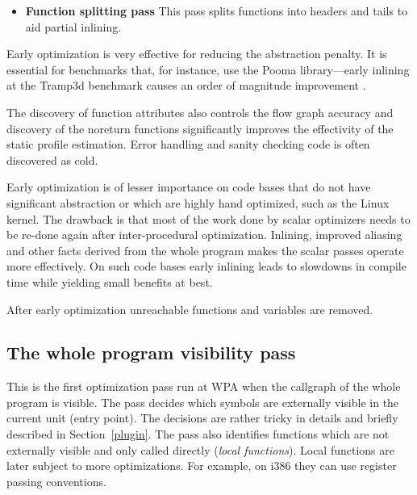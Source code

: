 \documentclass[final]{ols}
\begin{document}
\begin{itemize}
GCC has C and C++ language
extensions that allow the programmer to specify several function attributes as
optimization hints.  In this pass some of those attributes can be auto-detected.
In particular we detect functions that cannot throw
(), functions that never returns (), and
 and  functions.  Const functions in GCC terminology
are functions that only return their value and their return value
depends only on the function arguments. For many optimization passes const functions behave like a
simple expression (allowing dead code removal, common subexpression
elimination etc.).  Pure functions are like const functions but are allowed to read global
memory. See \cite{GCCmanual} for details.
\item {\bf Function splitting pass}  This pass splits functions into headers
and tails to aid partial inlining.
\end{itemize}
Early optimization is very effective for reducing the abstraction penalty.  It
is essential for benchmarks that, for instance, use the Pooma library---early
inlining at the Tramp3d benchmark \cite{richi} causes an order of magnitude
improvement \cite{callgraph2007}.

The discovery of function attributes also controls the flow graph accuracy and
discovery of the noreturn functions significantly improves the effectivity of the static
profile estimation. Error handling and sanity checking code is  often
discovered as cold.

Early optimization is of lesser importance on code bases that do not have
significant abstraction or which are highly hand optimized, such as the Linux kernel. The 
drawback is that most of the work done by scalar optimizers needs to be re-done
again after inter-procedural optimization. Inlining, improved aliasing and other
facts derived from the whole program makes the scalar passes operate more effectively.
On such code bases early inlining leads to slowdowns in compile time while
yielding small benefits at best.

After early optimization unreachable functions and variables are removed.

\subsection{The whole program visibility pass}
This is the first optimization pass run at WPA when the callgraph of the whole
program is visible.  The pass decides which symbols are externally visible in
the current unit (entry point).  The decisions are rather tricky in details
and briefly described in Section~\ref{plugin}.  The pass also identifies
functions which are not externally visible and only called directly ({\em local
functions}). Local functions are later subject to more optimizations. For example,
on i386 they can use register passing conventions.
\end{document}
